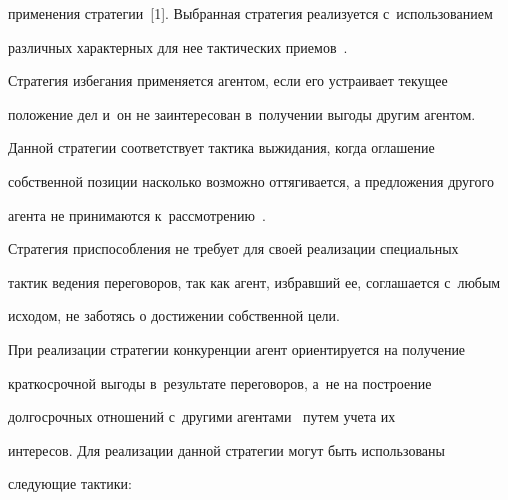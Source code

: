 применения стратегии~[1]. Выбранная стратегия реализуется с~использованием 


различных характерных для нее тактических приемов~\cite{13-lis}. 


  


  Стратегия избегания применяется агентом, если его устраивает текущее 


положение дел и~он не заинтересован в~получении выгоды другим агентом. 


Данной стратегии соответствует тактика выжидания, когда оглашение 


собственной позиции насколько возможно оттягивается, а предложения другого 


агента не принимаются к~рассмотрению~\cite{13-lis}. 


  


  Стратегия приспособления не требует для своей реализации специальных 


тактик ведения переговоров, так как агент, избравший ее, соглашается с~любым 


исходом, не заботясь о достижении собственной цели.


  


  При реализации стратегии конкуренции агент ориентируется на получение 


краткосрочной выгоды в~результате переговоров, а~не на построение 


долгосрочных отношений с~другими агентами~\cite{14-lis} путем учета их 


интересов. Для реализации данной стратегии могут быть использованы 


следующие тактики:



